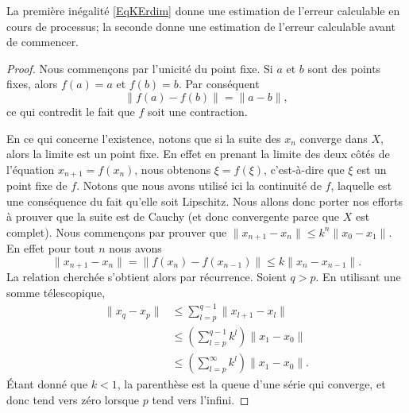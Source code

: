 La première inégalité \eqref{EqKErdim} donne une estimation de l'erreur calculable en cours de processus; la seconde donne une estimation de l'erreur calculable avant de commencer.

\begin{proof}
	Nous commençons par l'unicité du point fixe. Si \( a\) et \( b\) sont des points fixes, alors \( f(a)=a\) et \( f(b)=b\). Par conséquent
	\begin{equation}
		\| f(a)-f(b) \|=\| a-b \|,
	\end{equation}
	ce qui contredit le fait que \( f\) soit une contraction.

	En ce qui concerne l'existence, notons que si la suite des \( x_n\) converge dans \( X\), alors la limite est un point fixe. En effet en prenant la limite des deux côtés de l'équation \( x_{n+1}=f(x_n)\), nous obtenons \( \xi=f(\xi)\), c'est-à-dire que \( \xi\) est un point fixe de \( f\). Notons que nous avons utilisé ici la continuité de \( f\), laquelle est une conséquence du fait qu'elle soit Lipschitz. Nous allons donc porter nos efforts à prouver que la suite est de Cauchy (et donc convergente parce que \( X\) est complet). Nous commençons par prouver que \( \| x_{n+1}-x_n \|\leq k^n\| x_0-x_1 \|\). En effet pour tout \( n\) nous avons
	\begin{equation}
		\| x_{n+1}-x_n \|=\| f(x_n)-f(x_{n-1}) \|\leq k\| x_n-x_{n-1} \|.
	\end{equation}
	La relation cherchée s'obtient alors par récurrence. Soient \( q>p\). En utilisant une somme télescopique,
	\begin{subequations}
		\begin{align}
			\| x_q-x_p \| & \leq \sum_{l=p}^{q-1}\| x_{l+1}-x_l \|                 \\
			              & \leq \left( \sum_{l=p}^{q-1}k^l \right)\| x_1-x_0 \|   \\
			              & \leq \left(\sum_{l=p}^{\infty}k^l\right)\| x_1-x_0 \|.
		\end{align}
	\end{subequations}
	Étant donné que \( k<1\), la parenthèse est la queue d'une série qui converge, et donc tend vers zéro lorsque \( p\) tend vers l'infini.


\end{proof}
